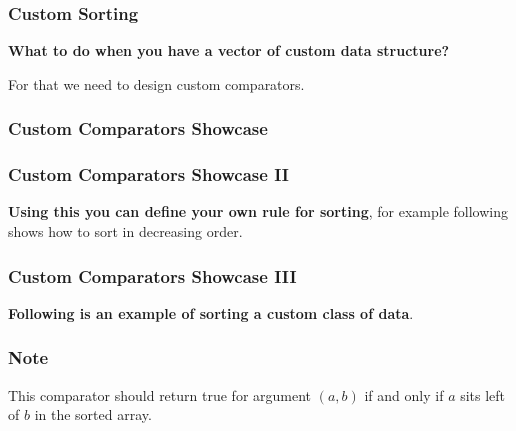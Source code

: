 \begin{frame}
    \frametitle{Custom Sorting}

    \textbf{What to do when you have a vector of custom data structure?}
    \pause[]
    
    For that we need to design custom comparators.

\end{frame}

\begin{frame}
    \frametitle{Custom Comparators Showcase}
    
\end{frame}

\begin{frame}
    \frametitle{Custom Comparators Showcase II}
    \textbf{Using this you can define your own rule for sorting}, for example following shows
    how to sort in decreasing order.
    \pause[]

    
\end{frame}


\begin{frame}
    \frametitle{Custom Comparators Showcase III}
    \textbf{Following is an example of sorting a custom class of data}.
    \pause[]
    
    
\end{frame}

\begin{frame}
    \frametitle{Note}

    This comparator should return true for argument $(a, b)$ if and only if
    $a$ sits left of $b$ in the sorted array.

\end{frame}
